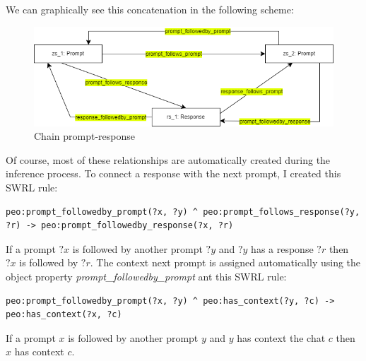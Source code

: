 We can graphically see this concatenation in the following scheme:
\begin{figure}[H]
    \centering
    \includegraphics[width=0.9\linewidth]{Figures/fig_30.png}
    \caption{Chain prompt-response}
    \label{fig:enter-label}
\end{figure}
Of course, most of these relationships are automatically created during the inference process. To connect a response with the next prompt, I created this SWRL rule:
\begin{lstlisting}
peo:prompt_followedby_prompt(?x, ?y) ^ peo:prompt_follows_response(?y, ?r) -> peo:prompt_followedby_response(?x, ?r)
\end{lstlisting}
If a prompt $?x$ is followed by another prompt $?y$ and $?y$ has a response $?r$ then $?x$ is followed by $?r$. The context next prompt is assigned automatically using the object property \textit{prompt\_followedby\_prompt} ant this SWRL rule:
\begin{lstlisting}
peo:prompt_followedby_prompt(?x, ?y) ^ peo:has_context(?y, ?c) -> peo:has_context(?x, ?c)
\end{lstlisting}
If a prompt $x$ is followed by another prompt $y$ and $y$ has context the chat $c$ then $x$ has context $c$.






